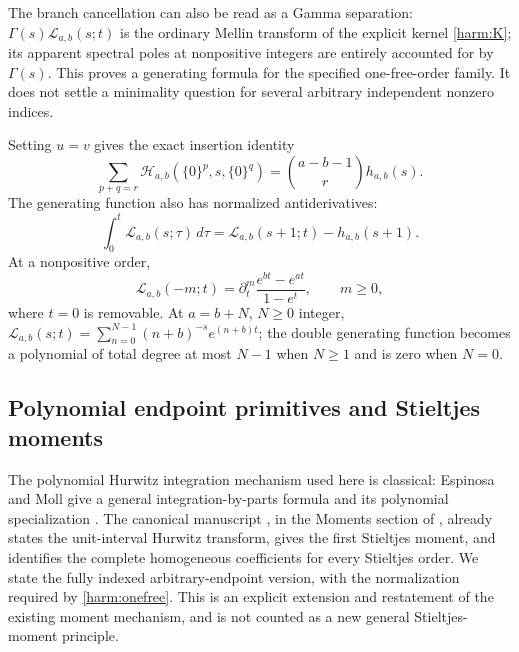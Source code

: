 \documentclass[11pt,a4paper]{article}
\numberwithin{equation}{section}
\theoremstyle{definition}
\theoremstyle{remark}
\newcommand{\src}[1]{\texttt{\detokenize{#1}}}
\begin{document}
The branch cancellation can also be read as a Gamma separation:
$\Gamma(s)\mathcal L_{a,b}(s;t)$ is the ordinary Mellin transform
of the explicit kernel \eqref{harm:K}; its apparent spectral poles at
nonpositive integers are entirely accounted for by $\Gamma(s)$.
This proves a generating formula for the specified one-free-order
family. It does not settle a minimality question for several arbitrary
independent nonzero indices.

Setting $u=v$ gives the exact insertion identity
\begin{equation}
 \sum_{p+q=r}\mathcal H_{a,b}(\{0\}^p,s,\{0\}^q)
                  =\binom{a-b-1}{r}h_{a,b}(s).
 \label{harm:diagonalzero}
\end{equation}
The generating function also has normalized antiderivatives:
\begin{equation}
 \int_0^t\mathcal L_{a,b}(s;\tau)\,d\tau
            =\mathcal L_{a,b}(s+1;t)-h_{a,b}(s+1).
 \label{harm:Lerchprimitive}
\end{equation}
At a nonpositive order,
\begin{equation}
 \mathcal L_{a,b}(-m;t)
      =\partial_t^m\frac{e^{bt}-e^{at}}{1-e^t},
 \qquad m\ge0,
 \label{harm:Lerchnegative}
\end{equation}
where $t=0$ is removable. At $a=b+N$, $N\ge0$ integer,
$\mathcal L_{a,b}(s;t)=\sum_{n=0}^{N-1}(n+b)^{-s}e^{(n+b)t}$;
the double generating function becomes a polynomial of total degree at
most $N-1$ when $N\ge1$ and is zero when $N=0$.

\subsection{Polynomial endpoint primitives and Stieltjes moments}

The polynomial Hurwitz integration mechanism used here is classical:
Espinosa and Moll give a general integration-by-parts formula and its
polynomial specialization \cite[Theorem~2.1 and Example~2.2]{harm:EM}.
The canonical manuscript \cite{source:manuscript}, in the Moments section
of \src{chapters/07-integration.tex}, already states the unit-interval
Hurwitz transform, gives the first Stieltjes moment, and identifies the complete
homogeneous coefficients for every Stieltjes order. We state the fully
indexed arbitrary-endpoint version, with the normalization required by
\eqref{harm:onefree}. This is an explicit extension and restatement of
the existing moment mechanism, and is not counted as a new general
Stieltjes-moment principle.
\end{document}
